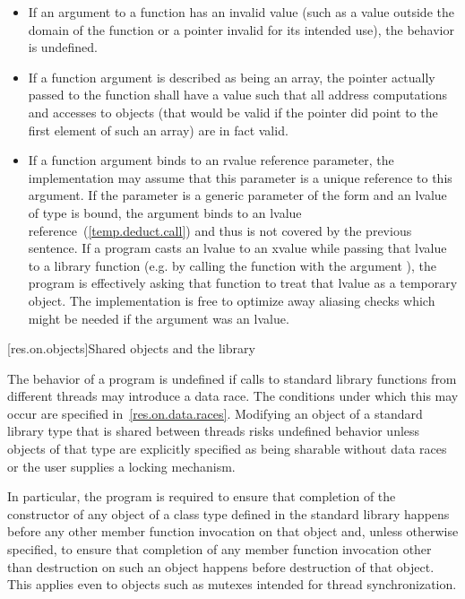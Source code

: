 \begin{itemize}
\item
If an argument to a function has an invalid value (such
%
as a value outside the domain of the function or a pointer invalid for its
intended use), the behavior is undefined.
%

\item
If a function argument is described as being an array,
%
the pointer actually passed to the function shall have a value such that all
address computations and accesses to objects (that would be valid if the
pointer did point to the first element of such an array) are in fact valid.

\item
If a function argument binds to an rvalue reference parameter, the implementation may
assume that this parameter is a unique reference to this argument.
\enternote
If the parameter is a generic parameter of the form  and an lvalue of type
 is bound, the argument binds to an lvalue reference~(\ref{temp.deduct.call})
and thus is not covered by the previous sentence. \exitnote \enternote If a program casts
an lvalue to an xvalue while passing that lvalue to a library function (e.g. by calling the function
with the argument ), the program
is effectively asking that function to treat that lvalue as a temporary object. The implementation
is free to optimize away aliasing checks which might be needed if the argument was
an lvalue. \exitnote
\end{itemize}

[res.on.objects]{Shared objects and the library}

\pnum
The behavior of a program is undefined if calls to standard library functions from different
threads may introduce a data race. The conditions under which this may occur are specified
in~\ref{res.on.data.races}. \enternote Modifying an object of a standard library type that is
shared between threads risks undefined behavior unless objects of that type are explicitly
specified as being sharable without data races or the user supplies a locking mechanism. \exitnote

\pnum
\enternote In particular, the program is required to ensure that completion
of the constructor of any object of a class type defined in the standard library
happens before any other member function invocation on that object and, unless
otherwise specified, to ensure that completion of any member function invocation
other than destruction on such an object happens before destruction of that object.
This applies even to objects such as mutexes intended for thread synchronization. \exitnote

